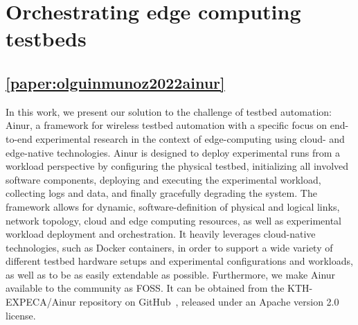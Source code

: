 \FloatBarrier%
\section{Orchestrating edge computing testbeds}

\subsection{\cref{paper:olguinmunoz2022ainur}}\label{summary:2022ainur}


In this work, we present our solution to the challenge of testbed automation: Ainur, a framework for wireless testbed automation with a specific focus on end-to-end experimental research in the context of edge-computing using cloud- and edge-native technologies.
Ainur is designed to deploy experimental runs from a workload perspective by configuring the physical testbed, initializing all involved software components, deploying and executing the experimental workload, collecting logs and data, and finally gracefully degrading the system.
The framework allows for dynamic, software-definition of physical and logical links, network topology, cloud and edge computing resources, as well as experimental workload deployment and orchestration.
It heavily leverages cloud-native technologies, such as Docker containers, in order to support a wide variety of different testbed hardware setups and experimental configurations and workloads, as well as to be as easily extendable as possible.
Furthermore, we make Ainur available to the community as \ac{FOSS}.
It can be obtained from the {KTH-EXPECA/Ainur} repository on GitHub~\cite{ainur:github}, released under an Apache version \num{2.0} license.

